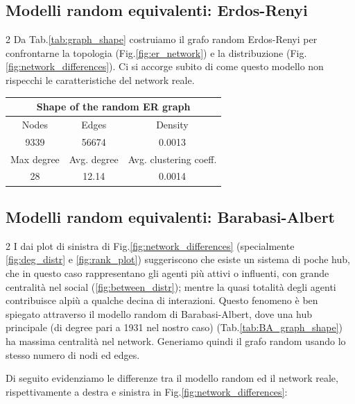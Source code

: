 \documentclass{article}
\begin{document}
\subsection{Modelli random equivalenti: Erdos-Renyi}
\begin{multicols}{2}
   Da Tab.\ref{tab:graph_shape} costruiamo il grafo random Erdos-Renyi per confrontarne la topologia (Fig.\ref{fig:er_network})
   e la distribuzione (Fig.\ref{fig:network_differences}).
   Ci si accorge subito di come questo modello non rispecchi le caratteristiche del network reale.

   \vspace{5pt}
   \begin{tabular}{|c|c|c|}            %
      \hline
      \multicolumn{3}{|c|}{Shape of the random ER graph} \\
      \hline
      Nodes & Edges & Density \\
      9339 & 56674 & 0.0013 \\
      \hline
      Max degree & Avg. degree & Avg. clustering coeff. \\
      28 & 12.14 & 0.0014 \\
      \hline
   \end{tabular}
   \label{tab:er_graph_shape}
   \vspace{5pt}

\end{multicols}

\subsection{Modelli random equivalenti: Barabasi-Albert}
\begin{multicols}{2}
   I dai plot di sinistra di Fig.\ref{fig:network_differences} (specialmente \ref{fig:deg_distr} e \ref{fig:rank_plot}) suggeriscono che esiste un sistema di poche hub,
   che in questo caso rappresentano gli agenti più attivi o influenti, con grande centralità nel social
   (\ref{fig:between_distr}); mentre la quasi totalità degli agenti contribuisce alpiù a qualche decina di interazioni.
   Questo fenomeno è ben spiegato attraverso il modello random di Barabasi-Albert, dove una hub principale (di degree pari a 1931 nel nostro caso) (Tab.\ref{tab:BA_graph_shape})
   ha massima centralità nel network.
   Generiamo quindi il grafo random usando lo stesso numero di nodi ed edges.

   Di seguito evidenziamo le differenze tra il modello random ed il network reale, rispettivamente a 
   destra e sinistra in Fig.\ref{fig:network_differences}:
\end{multicols}
\end{document}

